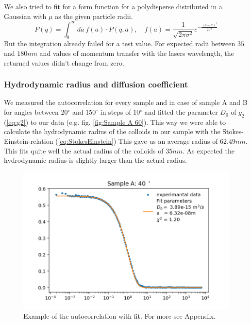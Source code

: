 \documentclass[]{article}
\begin{document}
We also tried to fit for a form function for a polydisperse distributed in a Gaussian with $\mu$ as the given particle radii. 
\[ \overline{P(q)} = \int_0^\infty da\: f(a)\cdot P(q,a) , \quad f(a)= \frac{1}{\sqrt{2 \pi \sigma^2}} e^{-\frac{(a-\mu)^2}{2 \sigma^2}} \]
But the integration already failed for a test value. For expected radii between $35$ and $180nm$ and values of momentum transfer with the lasers wavelength, the returned values didn't change from zero. 

\subsubsection{Hydrodynamic radius and diffusion coefficient}
We measured the autocorrelation for every sample and in case of sample A and B for angles between 20$^\circ$ and $150^\circ$ in steps of 10$^\circ$ and fitted the parameter $D_0$ of $g_2$ (\ref{eq:g2}) to our data (e.g. fig.  \ref{fig:Sample A 60}). This way we were able to calculate the hydrodynamic radius of the colloids in our sample with the Stokes-Einstein-relation (\ref{eq:StokesEinstein}) This gave us an average radius of $62.49 nm$. This fits quite well the actual radius of the colloids of $35nm$. As expected the  hydrodynamic radius is slightly larger than the actual radius. 


\begin{figure}[!htbp]
	\centering
	\includegraphics[width=0.7\linewidth]{Plots/A/40}
	\caption{Example of the autocorrelation with fit. For more see Appendix.}
	\label{fig:Sample A 40}
\end{figure}
\end{document}

